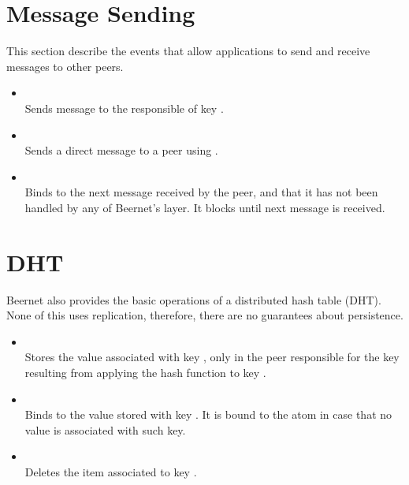 \documentclass[11pt]{article}
\begin{document}
\section{Message Sending}

This section describe the events that allow applications to send and receive
messages to other peers.

\begin{itemize}

\item {}\\ Sends message  to the responsible of
key .
 
\item {}\\ Sends a direct message  to a
peer using .


\item {}\\ Binds  to the next message received by
the peer, and that it has not been handled by any of Beernet's layer. It
blocks until next message is received. 

\end{itemize}

\section{DHT}

Beernet also provides the basic operations of a distributed hash table (DHT).
None of this uses replication, therefore, there are no guarantees about
persistence.

\begin{itemize}

\item {}\\ Stores the value  associated with key
, only in the peer responsible for the key resulting from applying
the hash function to key .

\item {}\\ Binds  to the value stored with key
. It is bound to the atom  in case that no value
is associated with such key.

\item {}\\ Deletes the item associated to key .

\end{itemize}
\end{document}
